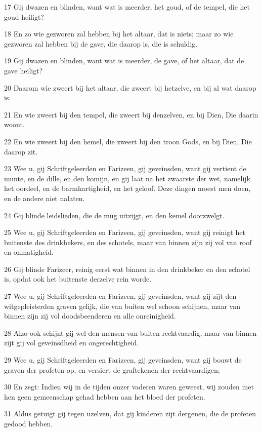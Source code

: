 \par 17 Gij dwazen en blinden, want wat is meerder, het goud, of de tempel, die het goud heiligt?
\par 18 En zo wie gezworen zal hebben bij het altaar, dat is niets; maar zo wie gezworen zal hebben bij de gave, die daarop is, die is schuldig.
\par 19 Gij dwazen en blinden, want wat is meerder, de gave, of het altaar, dat de gave heiligt?
\par 20 Daarom wie zweert bij het altaar, die zweert bij hetzelve, en bij al wat daarop is.
\par 21 En wie zweert bij den tempel, die zweert bij denzelven, en bij Dien, Die daarin woont.
\par 22 En wie zweert bij den hemel, die zweert bij den troon Gods, en bij Dien, Die daarop zit.
\par 23 Wee u, gij Schriftgeleerden en Farizeen, gij geveinsden, want gij vertient de munte, en de dille, en den komijn, en gij laat na het zwaarste der wet, namelijk het oordeel, en de barmhartigheid, en het geloof. Deze dingen moest men doen, en de andere niet nalaten.
\par 24 Gij blinde leidslieden, die de mug uitzijgt, en den kemel doorzwelgt.
\par 25 Wee u, gij Schriftgeleerden en Farizeen, gij geveinsden, want gij reinigt het buitenste des drinkbekers, en des schotels, maar van binnen zijn zij vol van roof en onmatigheid.
\par 26 Gij blinde Farizeer, reinig eerst wat binnen in den drinkbeker en den schotel is, opdat ook het buitenste derzelve rein worde.
\par 27 Wee u, gij Schriftgeleerden en Farizeen, gij geveinsden, want gij zijt den witgepleisterden graven gelijk, die van buiten wel schoon schijnen, maar van binnen zijn zij vol doodsbeenderen en alle onreinigheid.
\par 28 Alzo ook schijnt gij wel den mensen van buiten rechtvaardig, maar van binnen zijt gij vol geveinsdheid en ongerechtigheid.
\par 29 Wee u, gij Schriftgeleerden en Farizeen, gij geveinsden, want gij bouwt de graven der profeten op, en versiert de graftekenen der rechtvaardigen;
\par 30 En zegt: Indien wij in de tijden onzer vaderen waren geweest, wij zouden met hen geen gemeenschap gehad hebben aan het bloed der profeten.
\par 31 Aldus getuigt gij tegen uzelven, dat gij kinderen zijt dergenen, die de profeten gedood hebben.
